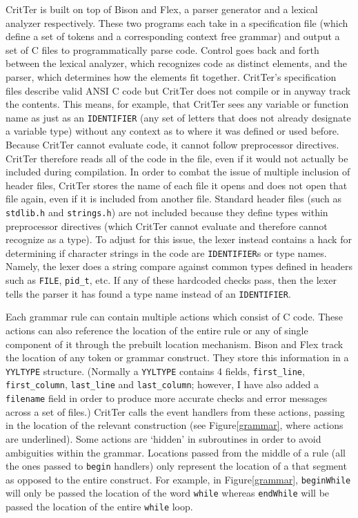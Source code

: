 \documentclass[12pt]{report}
\def\lstlistingname{Figure}
\newcommand{\refCode}{\lstlistingname \hspace{1mm}}
\newcommand{\programName}{CritTer\xspace}
\begin{document}
\programName is built on top of Bison and Flex, a parser generator and a lexical analyzer 
respectively. These two programs each take in a specification file (which define a set of tokens and a 
corresponding context free grammar) and output a set of C files to programmatically parse code. 
Control goes back and forth between the lexical analyzer, which recognizes code as distinct elements, 
and the parser, which determines how the elements fit together. \programName's specification files 
describe valid ANSI C code but \programName does not compile or in anyway track the contents. This 
means, for example, that \programName sees any variable or function name as just as an 
\lstinline{IDENTIFIER} (any set of letters that does not already designate a variable type) without any 
context as to where it was defined or used before. Because \programName cannot evaluate code, it 
cannot follow preprocessor directives. \programName therefore reads all of the code in the file, even if 
it would not actually be included during compilation. In order to combat the issue of multiple inclusion 
of header files, \programName stores the name of each file it opens and does not open that file again, 
even if it is included from another file. Standard header files (such as \lstinline{stdlib.h} and 
\lstinline{strings.h}) are not included because they define types within preprocessor directives (which 
\programName cannot evaluate and therefore cannot recognize as a type). To adjust for this issue, the 
lexer instead contains a hack for determining if character strings in the code are \lstinline{IDENTIFIER}s 
or type names. Namely, the lexer does a string compare against common types defined in headers 
such as \lstinline{FILE}, \lstinline{pid_t}, etc. If any of these hardcoded checks pass, then the lexer tells 
the parser it has found a type name instead of an \lstinline{IDENTIFIER}.

Each grammar rule can contain multiple actions which consist of C code. These actions can 
also reference the location of the entire rule or any of single component of it through the prebuilt 
location mechanism. Bison and Flex track the location of any token or grammar construct. They store 
this information in a \lstinline{YYLTYPE} structure. (Normally a \lstinline{YYLTYPE} contains 4 fields, 
\lstinline{first_line}, \lstinline{first_column}, \lstinline{last_line} and \lstinline{last_column}; however, I 
have also added a \lstinline{filename} field in order to produce more accurate checks and error 
messages across a set of files.) \programName calls the event handlers from these actions, passing in 
the location of the relevant construction (see \refCode \ref{grammar}, where actions are underlined). 
Some actions are `hidden' in subroutines in order to avoid ambiguities within the grammar. Locations 
passed from the middle of a rule (all the ones passed to \lstinline{begin} handlers) only represent the 
location of a that segment as opposed to the entire construct. For example, in \refCode \ref{grammar}, 
\lstinline{beginWhile} will only be passed the location of the word \lstinline{while} whereas 
\lstinline{endWhile} will be passed the location of the entire \lstinline{while} loop.
\end{document}
